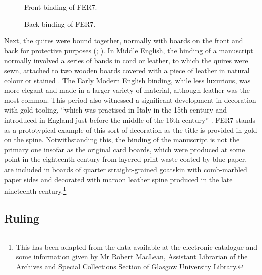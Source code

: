 \begin{paper}
\begin{figure}[H]
  \centering
  \begin{minipage}[b]{0.45\textwidth}
    \caption{Front binding of FER7.}
    \label{fig:lorente7}
  \end{minipage}
  \hfill
  \begin{minipage}[b]{0.45\textwidth}
    \caption{Back binding of FER7.}
    \label{fig:lorente8}
  \end{minipage}
\end{figure}
\newpage
Next, the quires were bound together, normally with boards on the front
and back for protective purposes (\cite[310]{johnston_writing_1944}; \cite[159]{mathisen_palaeography_2008}). In Middle English, the binding of a manuscript normally involved a
series of bands in cord or leather, to which the quires were sewn,
attached to two wooden boards covered with a piece of leather in natural
colour or stained \citep[44]{derolez_palaeography_2003}. The Early Modern English binding,
while less luxurious, was more elegant and made in a larger variety of
material, although leather was the most common. This period also witnessed
a significant development in decoration with gold tooling, ``which was
practised in Italy in the 15th century and introduced in England just
before the middle of the 16th century'' \citep[7]{petti_english_1977}. FER7 stands as
a prototypical example of this sort of decoration as the title is
provided in gold on the spine. Notwithstanding this, the binding of the
manuscript is not the primary one insofar as the original card boards,
which were produced at some point in the eighteenth century from layered
print waste coated by blue paper, are included in boards of quarter
straight-grained goatskin with comb-marbled paper sides and decorated with maroon leather spine produced in the late nineteenth
century.\footnote{This has been adapted from the data available at the
  electronic catalogue and some information given by Mr Robert MacLean,
  Assistant Librarian of the Archives and Special Collections Section of
  Glasgow University Library.}



\subsection{Ruling}


\end{paper}
